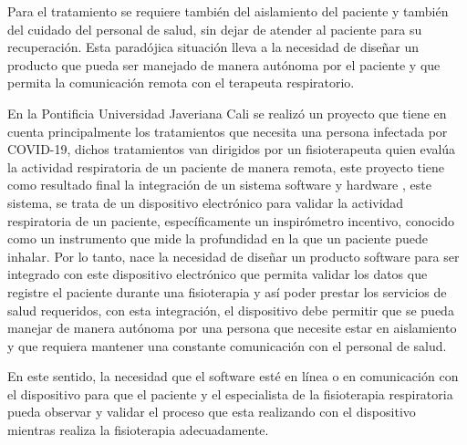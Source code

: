 Para el tratamiento se requiere tambi\'en del aislamiento del paciente y tambi\'en del cuidado del personal de salud, sin dejar de atender al paciente para su recuperaci\'on. Esta parad\'ojica situaci\'on lleva a la necesidad de dise\~{n}ar un producto que pueda ser manejado de manera aut\'onoma por el paciente y que permita la comunicaci\'on remota con el terapeuta respiratorio. 



En la Pontificia Universidad Javeriana Cali se realizó un proyecto que tiene en cuenta principalmente los tratamientos que necesita una persona infectada por COVID-19, dichos tratamientos van dirigidos por un fisioterapeuta quien eval\'ua la actividad respiratoria de un paciente de manera remota, este proyecto tiene como resultado final la integraci\'on de un sistema software y hardware \cite{45}, este sistema, se trata de un dispositivo electr\'onico para validar la actividad respiratoria de un paciente, espec\'ificamente un inspir\'ometro incentivo, conocido como un instrumento que mide la profundidad en la que un paciente puede inhalar. Por lo tanto, nace la necesidad de dise\~{n}ar un producto software para ser integrado con este dispositivo electr\'onico que permita validar los datos que registre el paciente durante una fisioterapia y as\'i poder prestar los servicios de salud requeridos, con esta integraci\'on, el dispositivo debe permitir que se pueda manejar de manera aut\'onoma por una persona que necesite estar en aislamiento y que requiera mantener una constante comunicaci\'on con el personal de salud.

En este sentido, la necesidad que el software esté en l\'inea o en comunicación con el dispositivo para que el paciente y el especialista de la fisioterapia respiratoria pueda observar y validar el proceso que esta realizando con el dispositivo mientras realiza la fisioterapia adecuadamente.